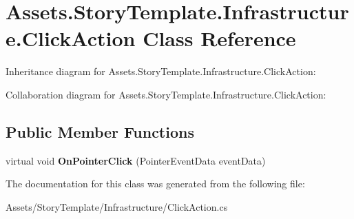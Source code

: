 \hypertarget{classAssets_1_1StoryTemplate_1_1Infrastructure_1_1ClickAction}{}\section{Assets.\+Story\+Template.\+Infrastructure.\+Click\+Action Class Reference}
\label{classAssets_1_1StoryTemplate_1_1Infrastructure_1_1ClickAction}


Inheritance diagram for Assets.\+Story\+Template.\+Infrastructure.\+Click\+Action\+:


Collaboration diagram for Assets.\+Story\+Template.\+Infrastructure.\+Click\+Action\+:
\subsection*{Public Member Functions}
\begin{DoxyCompactItemize}
\item 
virtual void {\bfseries On\+Pointer\+Click} (Pointer\+Event\+Data event\+Data)\hypertarget{classAssets_1_1StoryTemplate_1_1Infrastructure_1_1ClickAction_ac234add12f7901f183baee5737b6f04b}{}\label{classAssets_1_1StoryTemplate_1_1Infrastructure_1_1ClickAction_ac234add12f7901f183baee5737b6f04b}

\end{DoxyCompactItemize}


The documentation for this class was generated from the following file\+:\begin{DoxyCompactItemize}
\item 
Assets/\+Story\+Template/\+Infrastructure/Click\+Action.\+cs\end{DoxyCompactItemize}
